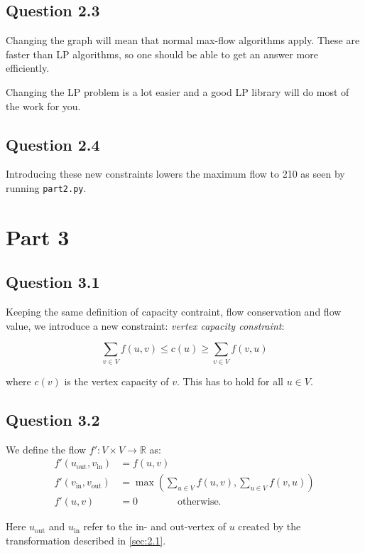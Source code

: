 \documentclass{sig-alternate}
\begin{document}
\subsection*{Question 2.3}
Changing the graph will mean that normal max-flow algorithms apply. These are
faster than LP algorithms, so one should be able to get an answer more
efficiently.

Changing the LP problem is a lot easier and a good LP library will do most of
the work for you.

\subsection*{Question 2.4}

Introducing these new constraints lowers the maximum flow to 210 as seen by
running \verb+part2.py+.

\section{Part 3}

\subsection*{Question 3.1}\label{sec:3.1}


Keeping the same definition of capacity contraint, flow conservation and
flow value, we introduce a new constraint: \textit{vertex capacity constraint}:

\[
\sum_{v\in V} f(u, v) \le c(u) \ge \sum_{v\in V} f(v, u)
\]

where $c(v)$ is the vertex capacity of $v$. This has to hold for all $u\in V$.

\subsection*{Question 3.2}

We define the flow $f' : V \times V \to \mathbb{R}$ as:
\begin{align}
    \label{eq1} f'(u_{\text{out}}, v_{\text{in}}) &= f(u,v) \\
    \label{eq2} f'(v_{\text{in}}, v_{\text{out}}) &= \max\left(\sum_{u\in V} f(u, v), \sum_{u\in V} f(v, u)\right) \\
    \label{eq3} f'(u,v) &= 0 \qquad\qquad\text{otherwise.}
\end{align}

Here $u_{\text{out}}$ and $u_{\text{in}}$ refer to the in- and out-vertex of
$u$ created by the transformation described in \autoref{sec:2.1}.
\end{document}
